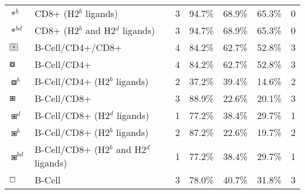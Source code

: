 \begin{tabular}{llccccc}
                                          $ \ast^b $ &                    CD8+ (H2$^b$ ligands) &            3 &         94.7\% &          68.9\% &         65.3\% &                          0 \\
                                       $ \ast^{bd} $ &         CD8+ (H2$^b$ and H2$^d$ ligands) &            3 &         94.7\% &          68.9\% &         65.3\% &                          0 \\
 $ \setlength{\fboxsep}{0.5pt} \boxed{\circledast} $ &                         B-Cell/CD4+/CD8+ &            4 &         84.2\% &          62.7\% &         52.8\% &                          3 \\
                                      $ \boxcircle $ &                              B-Cell/CD4+ &            4 &         84.2\% &          62.7\% &         52.8\% &                          3 \\
                                    $ \boxcircle^b $ &             B-Cell/CD4+ (H2$^b$ ligands) &            2 &         37.2\% &          39.4\% &         14.6\% &                          2 \\
                                         $ \boxast $ &                              B-Cell/CD8+ &            3 &         88.9\% &          22.6\% &         20.1\% &                          3 \\
                                       $ \boxast^d $ &             B-Cell/CD8+ (H2$^d$ ligands) &            1 &         77.2\% &          38.4\% &         29.7\% &                          1 \\
                                       $ \boxast^b $ &             B-Cell/CD8+ (H2$^b$ ligands) &            2 &         87.2\% &          22.6\% &         19.7\% &                          2 \\
                                    $ \boxast^{bd} $ &  B-Cell/CD8+ (H2$^b$ and H2$^d$ ligands) &            1 &         77.2\% &          38.4\% &         29.7\% &                          1 \\
                                       $ \boxempty $ &                                   B-Cell &            3 &         78.0\% &          40.7\% &         31.8\% &                          3 \\
\bottomrule
\end{tabular}
